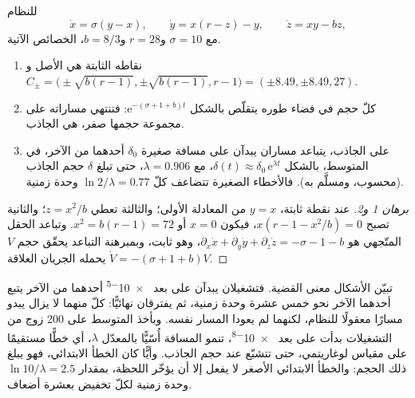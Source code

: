 \begin{proposition}\label{prop:b2:weather-systems:lorenz}
للنظام
\[
  \dot x = \sigma(y - x), \qquad \dot y = x(r - z) - y, \qquad \dot z = xy - bz,
\]
مع $\sigma = 10$ و$r = 28$ و$b = 8/3$، الخصائص الآتية.
\begin{enumerate}
  \item نقاطه الثابتة هي الأصل و$C_\pm = \bigl(\pm\sqrt{b(r - 1)}, \pm\sqrt{b(r - 1)},
        r - 1\bigr) = (\pm 8.49, \pm 8.49, 27)$.
  \item كلّ حجم في فضاء طوره يتقلّص بالشكل $\mathrm{e}^{-(\sigma + 1 + b)t}$: فتنتهي
        مساراته على مجموعة حجمها صفر، هي الجاذب.
  \item على الجاذب، يتباعد مساران يبدآن على مسافة صغيرة $\delta_0$ أحدهما من الآخر،
        في المتوسط، بالشكل $\delta(t) \approx \delta_0\,\mathrm{e}^{\lambda t}$، مع $\lambda =
        0.906$، حتى تبلغ $\delta$ حجم الجاذب (محسوب، ومسلَّم به). فالأخطاء الصغيرة
        تتضاعف كلّ $\ln 2/\lambda = 0.77$ وحدة زمنية.
\end{enumerate}
\end{proposition}

\begin{proof}[برهان 1 و2]
عند نقطة ثابتة، $y = x$ من المعادلة الأولى؛ والثالثة تعطي $z = x^2/b$؛ والثانية
تصبح $x(r - 1 - x^2/b) = 0$، فيكون $x = 0$ أو $x^2 = b(r - 1) = 72$. وتباعد
الحقل المتّجهي هو $\partial_x\dot x + \partial_y\dot y + \partial_z\dot z = -\sigma - 1 - b$، وهو
ثابت، وبمبرهنة التباعد يحقّق حجم $V$ يحمله الجريان العلاقة $\dot V =
-(\sigma + 1 + b)V$.
\end{proof}

تبيّن الأشكال معنى القضية. فتشغيلان يبدآن على بعد \num{e-5} أحدهما من الآخر يتبع أحدهما
الآخر نحو خمس عشرة وحدة زمنية، ثم يفترقان نهائيًّا: كلّ منهما لا يزال يبدو مسارًا
معقولًا للنظام، لكنهما لم يعودا المسار نفسه. وبأخذ المتوسط على 200 زوج من
التشغيلات بدأت على بعد \num{e-8}، تنمو المسافة أُسّيًّا بالمعدّل $\lambda$، أي خطًّا
مستقيمًا على مقياس لوغاريتمي، حتى تتشبّع عند حجم الجاذب. وأيًّا كان
الخطأ الابتدائي، فهو يبلغ ذلك الحجم: والخطأ الابتدائي الأصغر لا يفعل إلا أن يؤخّر اللحظة، بمقدار
$\ln 10/\lambda = 2.5$ وحدة زمنية لكلّ تخفيض بعشرة أضعاف.


